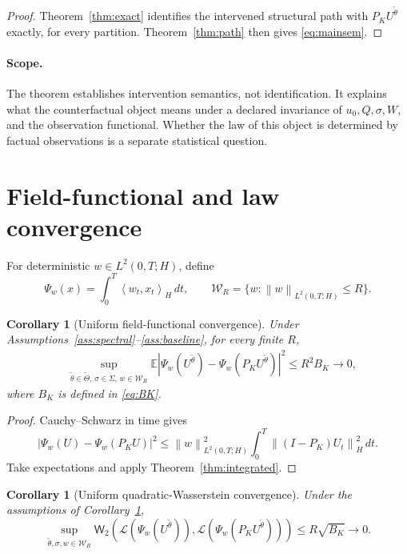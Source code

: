 \documentclass[11pt]{article}
\newtheorem{corollary}[assumption]{Corollary}
\theoremstyle{remark}
\newcommand{\E}{\mathbb E}
\newcommand{\1}{\mathbf 1}
\newcommand{\ip}[2]{\left\langle #1,#2\right\rangle_H}
\newcommand{\norm}[1]{\left\lVert #1\right\rVert}
\newcommand{\hnorm}[1]{\left\lVert #1\right\rVert_H}
\newcommand{\Wass}{\mathsf W_2}
\newcommand{\Law}{\mathcal L}
\newcommand{\ThetaI}{\widetilde\Theta}
\begin{document}
\begin{proof}
Theorem~\ref{thm:exact} identifies the intervened structural path with \(P_KU^{\widetilde\theta}\) exactly, for every partition.  Theorem~\ref{thm:path} then gives \eqref{eq:mainsem}.
\end{proof}

\paragraph{Scope.}
The theorem establishes intervention semantics, not identification.  It explains what the counterfactual object means under a declared invariance of \(u_0,Q,\sigma,W\), and the observation functional.  Whether the law of this object is determined by factual observations is a separate statistical question.

\section{Field-functional and law convergence}

For deterministic \(w\in L^2(0,T;H)\), define
\[
 \Psi_w(x)=\int_0^T\ip{w_t}{x_t}\,dt,
 \qquad
 \mathcal W_R=\{w:\norm{w}_{L^2(0,T;H)}\le R\}.
\]

\begin{corollary}[Uniform field-functional convergence]\label{cor:functional}
Under Assumptions~\ref{ass:spectral}--\ref{ass:baseline}, for every finite \(R\),
\begin{align}
 &\sup_{\widetilde\theta\in\ThetaI,\,\sigma\in\Sigma,\,w\in\mathcal W_R}
 \E\left|
 \Psi_w(U^{\widetilde\theta})
 -\Psi_w(P_KU^{\widetilde\theta})
 \right|^2
 \le R^2B_K
 \longrightarrow0,\label{eq:functionalbound}
\end{align}
where \(B_K\) is defined in \eqref{eq:BK}.
\end{corollary}

\begin{proof}
Cauchy--Schwarz in time gives
\[
 |\Psi_w(U)-\Psi_w(P_KU)|^2
 \le \norm{w}_{L^2(0,T;H)}^2
 \int_0^T\hnorm{(I-P_K)U_t}^2\,dt.
\]
Take expectations and apply Theorem~\ref{thm:integrated}.
\end{proof}

\begin{corollary}[Uniform quadratic-Wasserstein convergence]\label{cor:wasserstein}
Under the assumptions of Corollary~\ref{cor:functional},
\begin{equation}\label{eq:w2}
 \sup_{\widetilde\theta,\sigma,w\in\mathcal W_R}
 \Wass\!\left(
 \Law(\Psi_w(U^{\widetilde\theta})),
 \Law(\Psi_w(P_KU^{\widetilde\theta}))
 \right)
 \le R\sqrt{B_K}
 \longrightarrow0.
\end{equation}
\end{corollary}
\end{document}

